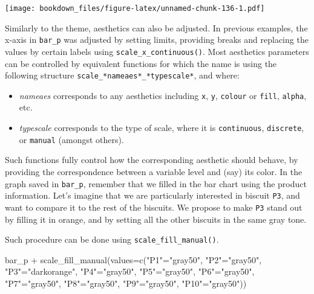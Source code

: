 \documentclass[
]{krantz}
\makeatletter
\newenvironment{Shaded}{\begin{snugshade}}{\end{snugshade}}
\newcommand{\AttributeTok}[1]{\textcolor[rgb]{0.61,0.61,0.61}{#1}}
\newcommand{\FunctionTok}[1]{\textcolor[rgb]{0,0,0}{#1}}
\newcommand{\NormalTok}[1]{#1}
\newcommand{\OtherTok}[1]{\textcolor[rgb]{0.37,0.37,0.37}{#1}}
\newcommand{\SpecialCharTok}[1]{\textcolor[rgb]{0,0,0}{#1}}
\newcommand{\StringTok}[1]{\textcolor[rgb]{0.5,0.5,0.5}{#1}}
\providecommand{\tightlist}{%
  \setlength{\itemsep}{0pt}\setlength{\parskip}{0pt}}
\newenvironment{kframe}{%
\medskip{}
\setlength{\fboxsep}{.8em}
 \def\at@end@of@kframe{}%
 \ifinner\ifhmode%
  \def\at@end@of@kframe{\end{minipage}}%
  \begin{minipage}{\columnwidth}%
 \fi\fi%
 \def\FrameCommand##1{\hskip\@totalleftmargin \hskip-\fboxsep
 \colorbox{shadecolor}{##1}\hskip-\fboxsep
     \hskip-\linewidth \hskip-\@totalleftmargin \hskip\columnwidth}%
 \MakeFramed {\advance\hsize-\width
   \@totalleftmargin\z@ \linewidth\hsize
   \@setminipage}}%
 {\par\unskip\endMakeFramed%
 \at@end@of@kframe}
\renewenvironment{Shaded}{\begin{kframe}}{\end{kframe}}
\makeatother
\begin{document}
\texttt{[image: bookdown\_files/figure-latex/unnamed-chunk-136-1.pdf]}

Similarly to the theme, aesthetics can also be adjusted. In previous examples, the x-axis in \texttt{bar\_p} was adjusted by setting limits, providing breaks and replacing the values by certain labels using \texttt{scale\_x\_continuous()}.
Most aesthetics parameters can be controlled by equivalent functions for which the name is using the following structure \texttt{scale\_*nameaes*\_*typescale*}, and where:

\begin{itemize}
\tightlist
\item
  \emph{nameaes} corresponds to any aesthetics including \texttt{x}, \texttt{y}, \texttt{colour} or \texttt{fill}, \texttt{alpha}, etc.
\item
  \emph{typescale} corresponds to the type of scale, where it is \texttt{continuous}, \texttt{discrete}, or \texttt{manual} (amongst others).
\end{itemize}

Such functions fully control how the corresponding aesthetic should behave, by providing the correspondence between a variable level and (say) its color.
In the graph saved in \texttt{bar\_p}, remember that we filled in the bar chart using the product information. Let's imagine that we are particularly interested in biscuit \texttt{P3}, and want to compare it to the rest of the biscuits. We propose to make \texttt{P3} stand out by filling it in orange, and by setting all the other biscuits in the same gray tone.

Such procedure can be done using \texttt{scale\_fill\_manual()}.

\begin{Shaded}
\begin{Highlighting}[]
\NormalTok{bar\_p }\SpecialCharTok{+} 
  \FunctionTok{scale\_fill\_manual}\NormalTok{(}\AttributeTok{values=}\FunctionTok{c}\NormalTok{(}\StringTok{"P1"}\OtherTok{=}\StringTok{"gray50"}\NormalTok{, }\StringTok{"P2"}\OtherTok{=}\StringTok{"gray50"}\NormalTok{, }
                             \StringTok{"P3"}\OtherTok{=}\StringTok{"darkorange"}\NormalTok{, }\StringTok{"P4"}\OtherTok{=}\StringTok{"gray50"}\NormalTok{, }
                             \StringTok{"P5"}\OtherTok{=}\StringTok{"gray50"}\NormalTok{, }\StringTok{"P6"}\OtherTok{=}\StringTok{"gray50"}\NormalTok{,}
                             \StringTok{"P7"}\OtherTok{=}\StringTok{"gray50"}\NormalTok{, }\StringTok{"P8"}\OtherTok{=}\StringTok{"gray50"}\NormalTok{,}
                             \StringTok{"P9"}\OtherTok{=}\StringTok{"gray50"}\NormalTok{, }\StringTok{"P10"}\OtherTok{=}\StringTok{"gray50"}\NormalTok{))}
\end{Highlighting}
\end{Shaded}
\end{document}
